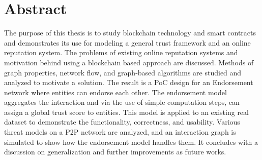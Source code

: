 \chapter*{Abstract}
The purpose of this thesis is to study blockchain technology and smart
contracts and demonstrates its use for modeling a general trust framework and
an online reputation system. The problems of existing online reputation systems
and motivation behind using a blockchain based approach are discussed. Methods
of graph properties, network flow, and graph-based algorithms are studied and
analyzed to motivate a solution. The result is a PoC design for an Endorsement
network where entities can endorse each other. The endorsement model aggregates
the interaction and via the use of simple computation steps, can assign a
global trust score to entities. This model is applied to an existing real
dataset to demonstrate the functionality, correctness, and usability. Various
threat models on a P2P network are analyzed, and an interaction graph is
simulated to show how the endorsement model handles them. It concludes with a
discussion on generalization and further improvements as future works. 
